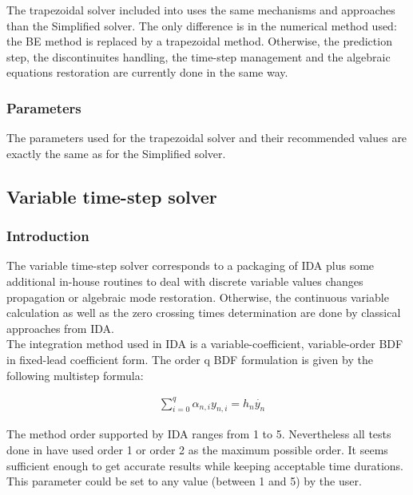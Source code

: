 \documentclass[a4paper, 12pt]{report}
\begin{document}
The trapezoidal solver included into \Dynawo uses the same mechanisms and approaches than the Simplified solver. The only difference is in the numerical method used: the \ac{BE} method is replaced by a trapezoidal method. Otherwise, the prediction step, the discontinuites handling, the time-step management and the algebraic equations restoration are currently done in the same way.

\subsubsection{Parameters}

The parameters used for the trapezoidal solver and their recommended values are exactly the same as for the Simplified solver.

\subsection{Variable time-step solver}
\label{IDA}

\subsubsection{Introduction}

The variable time-step solver corresponds to a packaging of \ac{IDA} plus some additional in-house routines to deal with discrete variable values changes propagation or algebraic mode restoration. Otherwise, the continuous variable calculation as well as the zero crossing times determination are done by classical approaches from \ac{IDA}. \\

The integration method used in \ac{IDA} is a variable-coefficient, variable-order \ac{BDF} in fixed-lead coefficient form. The order q BDF formulation is given by the following multistep formula:

\begin{equation}
\begin{aligned}
& \sum\limits_{i=0}^q \alpha_{n,i} y_{n,i} = h_{n}\dot{y_n}
\end{aligned}
\end{equation}

The method order supported by \ac{IDA} ranges from 1 to 5. Nevertheless all tests done in \Dynawo have used order 1 or order 2 as the maximum possible order. It seems sufficient enough to get accurate results while keeping acceptable time durations. This parameter could be set to any value (between 1 and 5) by the user. \\
\end{document}

